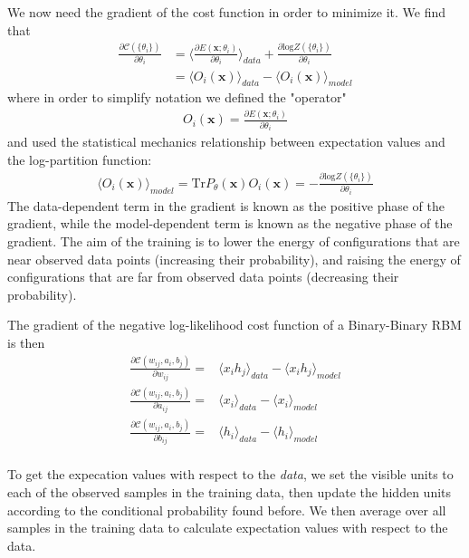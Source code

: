 \documentclass[norsk,a4paper,11pt]{article}
\begin{document}
We now need the gradient of the cost function in order to minimize it. We find that
\begin{align}
	\frac{\partial \mathcal{C}(\{ \theta_i\})}{\partial \theta_i}
	&= \langle \frac{\partial E(\bm{x}; \theta_i)}{\partial \theta_i} \rangle_{data}
	+ \frac{\partial \text{log} Z(\{ \theta_i\})}{\partial \theta_i} \\
	&= \langle O_i(\bm{x}) \rangle_{data} - \langle O_i(\bm{x}) \rangle_{model}
\end{align}
where in order to simplify notation we defined the "operator"
\begin{align}
	O_i(\bm{x}) = \frac{\partial E(\bm{x}; \theta_i)}{\partial \theta_i} 
\end{align}
and used the statistical mechanics relationship between expectation values and the log-partition function:
\begin{align}
	\langle O_i(\bm{x}) \rangle_{model} = \text{Tr} P_\theta(\bm{x})O_i(\bm{x}) = - \frac{\partial \text{log} Z(\{ \theta_i\})}{\partial \theta_i}
\end{align}
The data-dependent term in the gradient is known as the positive phase of the gradient, while the model-dependent term is known as the negative phase of the gradient. The aim of the training is to lower the energy of configurations that are near observed data points (increasing their probability), and raising the energy of configurations that are far from observed data points (decreasing their probability).

The gradient of the negative log-likelihood cost function of a Binary-Binary RBM is then
\begin{align}
	\frac{\partial \mathcal{C} (w_{ij}, a_i, b_j)}{\partial w_{ij}} =& \langle x_i h_j \rangle_{data} - \langle x_i h_j \rangle_{model} \\
	\frac{\partial \mathcal{C} (w_{ij}, a_i, b_j)}{\partial a_{ij}} =& \langle x_i \rangle_{data} - \langle x_i \rangle_{model} \\
	\frac{\partial \mathcal{C} (w_{ij}, a_i, b_j)}{\partial b_{ij}} =& \langle h_i \rangle_{data} - \langle h_i \rangle_{model} \\
\end{align}

To get the expecation values with respect to the \textit{data}, we set the visible units to each of the observed samples in the training data, then update the hidden units according to the conditional probability found before. We then average over all samples in the training data to calculate expectation values with respect to the data. 
\end{document}
